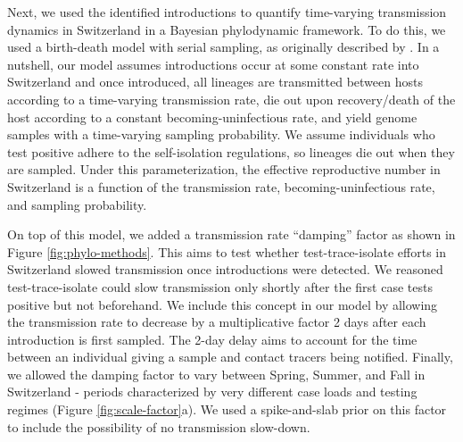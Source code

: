 \documentclass[9pt,twoside,lineno]{pnas-new} %
\begin{document}
Next, we used the identified introductions to quantify time-varying transmission dynamics in Switzerland in a Bayesian phylodynamic framework. To do this, we used a birth-death model with serial sampling, as originally described by \cite{stadler_2010_bds}. In a nutshell, our model assumes introductions occur at some constant rate into Switzerland and once introduced, all lineages are transmitted between hosts according to a time-varying transmission rate, die out upon recovery/death of the host according to a constant becoming-uninfectious rate, and yield genome samples with a time-varying sampling probability. We assume individuals who test positive adhere to the self-isolation regulations, so lineages die out when they are sampled. Under this parameterization, the effective reproductive number in Switzerland is a function of the transmission rate, becoming-uninfectious rate, and sampling probability.

On top of this model, we added a transmission rate ``damping'' factor as shown in Figure \ref{fig:phylo-methods}. This aims to test whether test-trace-isolate efforts in Switzerland slowed transmission once introductions were detected. We reasoned test-trace-isolate could slow transmission only shortly after the first case tests positive but not beforehand. We include this concept in our model by allowing the transmission rate to decrease by a multiplicative factor 2 days after each introduction is first sampled. The 2-day delay aims to account for the time between an individual giving a sample and contact tracers being notified. Finally, we allowed the damping factor to vary between Spring, Summer, and Fall in Switzerland - periods characterized by very different case loads and testing regimes (Figure \ref{fig:scale-factor}a). We used a spike-and-slab prior on this factor to include the possibility of no transmission slow-down. 
\end{document}
